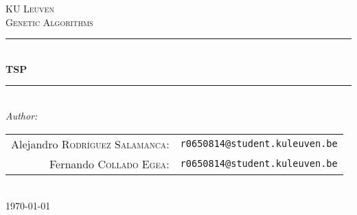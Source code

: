 \begin{titlepage}

\newcommand{\HRule}{\rule{\linewidth}{0.5mm}} %

\center %


\textsc{\LARGE KU Leuven}\\[3.5cm] %
\textsc{\Large Genetic Algorithms}\\[0.5cm] %


\HRule \\[0.4cm]
{ \huge \bfseries TSP}\\[0.4cm] %
\HRule \\[5.5cm]



\emph{Author:}\\[0.7cm]

\begin{tabular}{rl}
    Alejandro \textsc{Rodríguez Salamanca}: &\texttt{r0650814@student.kuleuven.be}\\
    Fernando \textsc{Collado Egea}: &\texttt{r0650814@student.kuleuven.be}\\

\end{tabular}\\[2cm]



{\large \today}\\[3cm] %




\vfill %

\end{titlepage}